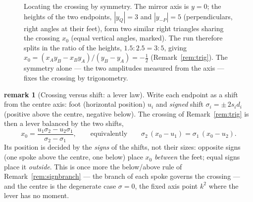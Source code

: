 \documentclass[11pt]{article}
\theoremstyle{definition}
\newtheorem{remark}{remark}
\begin{document}
\begin{figure}[htbp]
\centering
{}
\caption{Locating the crossing by symmetry. The mirror axis is $y=0$; the heights of the
two endpoints, $|y_Q|=3$ and $|y_{-P}|=5$ (perpendiculars, right angles at their feet),
form two similar right triangles sharing the crossing $x_0$ (equal vertical angles,
marked). The run therefore splits in the ratio of the heights, $1.5:2.5=3:5$, giving
$x_0=(x_A y_B-x_B y_A)/(y_B-y_A)=-\tfrac12$ (Remark~\ref{rem:trig}). The symmetry alone
--- the two amplitudes measured from the axis --- fixes the crossing by trigonometry.}
\label{fig:trigcross}
\end{figure}

\begin{remark}[Crossing versus shift: a lever law]\label{rem:crosslever}
Write each endpoint as a shift from the centre axis: foot (horizontal position) $u_i$
and \emph{signed} shift $\sigma_i=\pm\,2s_id_i$ (positive above the centre, negative
below). The crossing of Remark~\ref{rem:trig} is then a lever balanced by the two
shifts,
\[
  x_0=\frac{u_1\sigma_2-u_2\sigma_1}{\sigma_2-\sigma_1},
  \qquad\text{equivalently}\qquad
  \sigma_2\,(x_0-u_1)=\sigma_1\,(x_0-u_2).
\]
Its position is decided by the \emph{signs} of the shifts, not their sizes: opposite
signs (one spoke above the centre, one below) place $x_0$ \emph{between} the feet;
equal signs place it \emph{outside}. This is once more the below/above rule of
Remark~\ref{rem:signbranch} --- the branch of each spoke governs the crossing --- and
the centre is the degenerate case $\sigma=0$, the fixed axis point $k^{2}$ where the
lever has no moment.
\end{remark}
\end{document}
